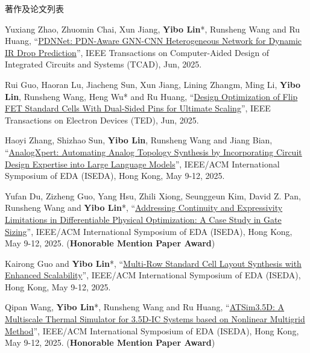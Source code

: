 \begin{rSection}{著作及论文列表}
\begin{description}[font=\normalfont, rightmargin=2em]
{}
            

\item[{[J183]}]{
        Yuxiang Zhao, Zhuomin Chai, Xun Jiang, \textbf{Yibo Lin}*, Runsheng Wang and Ru Huang, 
    ``\href{https://doi.org/10.1109/TCAD.2024.3509796}{PDNNet: PDN-Aware GNN-CNN Heterogeneous Network for Dynamic IR Drop Prediction}'', 
    IEEE Transactions on Computer-Aided Design of Integrated Circuits and Systems (TCAD), Jun, 2025.
    
}
            

\item[{[J182]}]{
        Rui Guo, Haoran Lu, Jiacheng Sun, Xun Jiang, Lining Zhangm, Ming Li, \textbf{Yibo Lin}, Runsheng Wang, Heng Wu* and Ru Huang, 
    ``\href{https://doi.org/10.1109/TED.2025.3558759}{Design Optimization of Flip FET Standard Cells With Dual-Sided Pins for Ultimate Scaling}'', 
    IEEE Transactions on Electron Devices (TED), Jun, 2025.
    
}
            

\item[{[C181]}]{
        Haoyi Zhang, Shizhao Sun, \textbf{Yibo Lin}, Runsheng Wang and Jiang Bian, 
    ``\href{https://doi.org/10.1109/ISEDA65950.2025.11100627}{AnalogXpert: Automating Analog Topology Synthesis by Incorporating Circuit Design Expertise into Large Language Models}'', 
    IEEE/ACM International Symposium of EDA (ISEDA), Hong Kong, May 9-12, 2025.
    
}
            

\item[{[C180]}]{
        Yufan Du, Zizheng Guo, Yang Hsu, Zhili Xiong, Seunggeun Kim, David Z. Pan, Runsheng Wang and \textbf{Yibo Lin}*, 
    ``\href{https://doi.org/10.1109/ISEDA65950.2025.11100319}{Addressing Continuity and Expressivity Limitations in Differentiable Physical Optimization: A Case Study in Gate Sizing}'', 
    IEEE/ACM International Symposium of EDA (ISEDA), Hong Kong, May 9-12, 2025.
    (\textbf{Honorable Mention Paper Award})
}
            

\item[{[C179]}]{
        Kairong Guo and \textbf{Yibo Lin}*, 
    ``\href{https://doi.org/10.1109/ISEDA65950.2025.11101126}{Multi-Row Standard Cell Layout Synthesis with Enhanced Scalability}'', 
    IEEE/ACM International Symposium of EDA (ISEDA), Hong Kong, May 9-12, 2025.
    
}
            

\item[{[C178]}]{
        Qipan Wang, \textbf{Yibo Lin}*, Runsheng Wang and Ru Huang, 
    ``\href{https://doi.org/10.1109/ISEDA65950.2025.11101154}{ATSim3.5D: A Multiscale Thermal Simulator for 3.5D-IC Systems based on Nonlinear Multigrid Method}'', 
    IEEE/ACM International Symposium of EDA (ISEDA), Hong Kong, May 9-12, 2025.
    (\textbf{Honorable Mention Paper Award})
}
            


\end{description}
\end{rSection}
